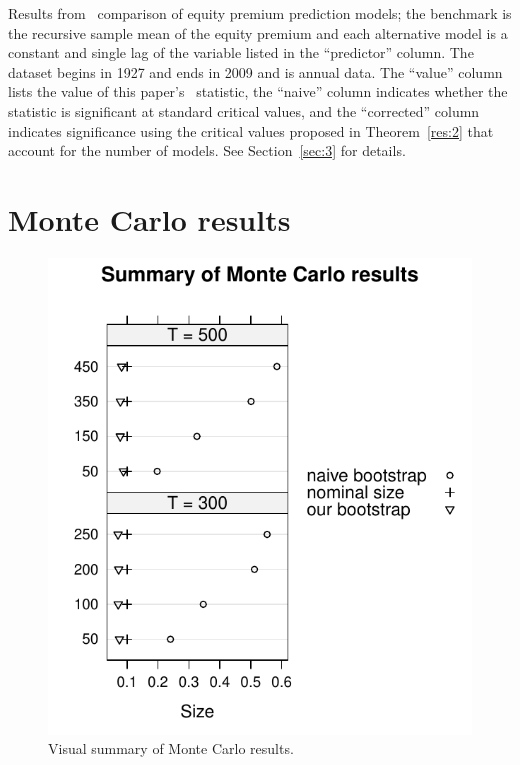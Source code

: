 \documentclass[12pt,fleqn]{article}
\begin{document}
\begin{table}[tb!]
  \centering
  \empiricaltable
\caption{Results from \oos\ comparison of equity premium prediction
  models; the benchmark is the recursive sample mean of the equity
  premium and each alternative model is a constant and single lag of
  the variable listed in the ``predictor'' column.  The dataset begins
  in 1927 and ends in 2009 and is annual data. The ``value'' column
  lists the value of this paper's \oos\ statistic, the ``naive''
  column indicates whether the statistic is significant at standard
  critical values, and the ``corrected'' column indicates significance
  using the critical values proposed in Theorem~\ref{res:2} that
  account for the number of models.  See Section~\ref{sec:3} for details.}
\label{tab:em1}
\end{table}

\section{Monte Carlo results}
\begin{figure}[t]
  \centering
  \includegraphics{montecarlo/west_iv.pdf}
  \caption{Visual summary of Monte Carlo results.}
  \label{fig:1}
\end{figure}
\end{document}
